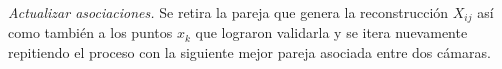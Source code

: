 %
%
%
\textit{Actualizar asociaciones.}\label{actualizar_asociaciones}
Se retira la pareja que genera la reconstrucción $X_{ij}$ así como también a los puntos $x_k$ que lograron validarla y se itera nuevamente repitiendo el proceso con la siguiente mejor pareja asociada entre dos cámaras.
%
